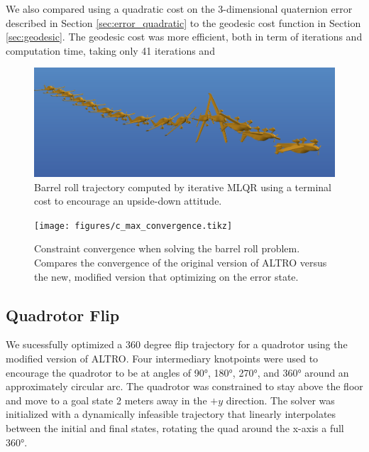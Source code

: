\documentclass[letterpaper, 10 pt, conference]{ieeeconf}  %
\begin{document}
        We also compared using a quadratic cost on the 3-dimensional quaternion error
        described in Section \ref{sec:error_quadratic} to the geodesic cost function in
        Section \ref{sec:geodesic}. The geodesic cost was more efficient, both in term of 
        iterations and computation time, taking only 41 iterations and 
        
        
        \begin{figure}[h]
            \centering
            \includegraphics[width=\columnwidth]{figures/barrellroll.png}
            \caption{Barrel roll trajectory computed by iterative MLQR using a terminal cost to encourage an upside-down attitude.}
            \label{fig:barrellroll}
        \end{figure}

        \begin{figure}[h]
            \centering
            \texttt{[image: figures/c\_max\_convergence.tikz]}
            \caption{Constraint convergence when solving the barrel roll problem. Compares 
            the convergence of the original version of ALTRO versus the new, modified version
            that optimizing on the error state.}
            \label{fig:c_max_convergence}
        \end{figure}

    \subsection{Quadrotor Flip}
        We sucessfully optimized a 360 degree flip trajectory for a quadrotor using the 
        modified version of ALTRO.
	    Four intermediary knotpoints were used to encourage the quadrotor to be at angles
        of \ang{90}, \ang{180}, \ang{270}, and \ang{360} around an approximately circular arc.
        The quadrotor was constrained
	    to stay above the floor and move to a goal state 2 meters away in the $+y$
	    direction. The solver was initialized with a dynamically infeasible trajectory
	    that linearly interpolates between the initial and final states, rotating the
        quad around the x-axis a full \ang{360}.
\end{document}
